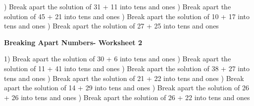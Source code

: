 \documentclass{article}%
\begin{document}
\newline%
\newline%
) Break apart the solution of 31 + 11 into tens and ones%
\newline%
\newline%
) Break apart the solution of 45 + 21 into tens and ones%
\newline%
\newline%
) Break apart the solution of 10 + 17 into tens and ones%
\newline%
\newline%
) Break apart the solution of 27 + 25 into tens and ones%
\newline%
\newline%
\newline%
\pagebreak%
\large%
\begin{center}%
\textbf{Breaking Apart Numbers- Worksheet 2}%
\newline%
\end{center} \normalsize%
1) Break apart the solution of 30 + 6 into tens and ones%
\newline%
\newline%
) Break apart the solution of 11 + 41 into tens and ones%
\newline%
\newline%
) Break apart the solution of 38 + 27 into tens and ones%
\newline%
\newline%
) Break apart the solution of 21 + 22 into tens and ones%
\newline%
\newline%
) Break apart the solution of 14 + 29 into tens and ones%
\newline%
\newline%
) Break apart the solution of 26 + 26 into tens and ones%
\newline%
\newline%
) Break apart the solution of 26 + 22 into tens and ones%
\newline%
\newline%
\end{document}
